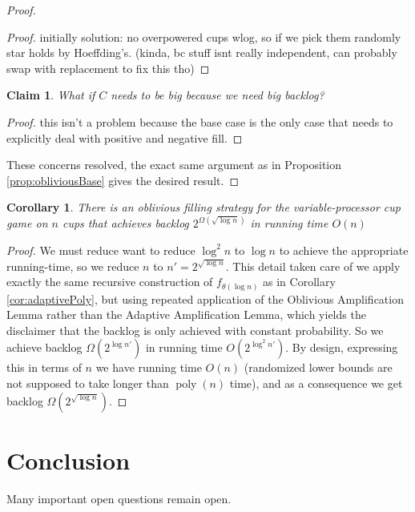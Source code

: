 \documentclass[twocolumn]{article}[10pt]
\DeclareMathOperator{\poly}{\text{poly}}
\newtheorem{clm}{Claim}
\newtheorem{corollary}{Corollary}
\begin{document}
\begin{proof}
\begin{proof}
    initially solution: no overpowered cups wlog, so if we pick them randomly star holds
    by Hoeffding's. (kinda, bc stuff isnt really independent, can probably swap
    with replacement to fix this tho)
  
\end{proof}
\begin{clm}
  What if $C$ needs to be big because we need big backlog? 
\end{clm}
\begin{proof}
 this isn't a problem because the base case is the only case that needs to
 explicitly deal with positive and negative fill.
\end{proof}
These concerns resolved, the exact same argument as in Proposition
\ref{prop:obliviousBase} gives the desired result.

\end{proof}

\begin{corollary}
  \label{cor:obliviousPoly}
  There is an oblivious filling strategy for the variable-processor cup game on
  $n$ cups that achieves backlog $2^{\Omega(\sqrt{\log n})}$ in running time
  $O(n)$
\end{corollary}
\begin{proof}
  We must reduce want to reduce $\log^2 n$ to $\log n$ to achieve the
  appropriate running-time, so we reduce $n$ to $n' = 2^{\sqrt{\log n}}$. This
  detail taken care of we apply exactly the same recursive construction of
  $f_{\theta(\log n)}$ as in Corollary \ref{cor:adaptivePoly}, but using
  repeated application of the Oblivious Amplification Lemma rather than the
  Adaptive Amplification Lemma, which yields the disclaimer that the backlog is
  only achieved with constant probability.
  So we achieve backlog $\Omega(2^{\log n'})$ in running time $O(2^{\log^2
  n'})$. By design, expressing this in terms of $n$ we have running time $O(n)$
  (randomized lower bounds are not supposed to take longer than $\poly(n)$
  time), and as a consequence we get backlog $\Omega(2^{\sqrt{\log n}})$.
\end{proof}

\section{Conclusion}
Many important open questions remain open.



\end{document}
